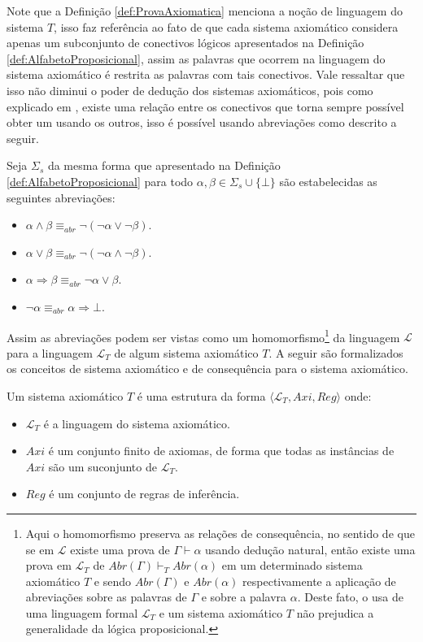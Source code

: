 Note que a Definição \ref{def:ProvaAxiomatica} menciona a noção de linguagem do sistema $T$, isso faz referência ao fato de que cada sistema axiomático considera apenas um subconjunto de conectivos lógicos apresentados na Definição \ref{def:AlfabetoProposicional}, assim as palavras que ocorrem na linguagem do sistema axiomático é restrita as palavras com tais conectivos. Vale ressaltar que isso não diminui o poder de dedução dos sistemas axiomáticos, pois como explicado em \cite{benja-Logica}, existe uma relação entre os conectivos que torna sempre possível obter um usando os outros, isso é possível usando abreviações como descrito a seguir. 

\begin{definicao}\label{def:Abreviacoes}
  Seja $\Sigma_s$ da mesma forma que apresentado na Definição \ref{def:AlfabetoProposicional} para todo $\alpha, \beta \in \Sigma_s \cup \{\bot\}$ são estabelecidas as seguintes abreviações:
  \begin{itemize}
      \item $\alpha \land \beta \equiv_{abr} \neg (\neg \alpha \lor \neg \beta)$.
      \item $\alpha \lor \beta \equiv_{abr} \neg (\neg \alpha \land \neg \beta)$.
      \item $\alpha \Rightarrow \beta \equiv_{abr} \neg \alpha \lor \beta$.
      \item $\neg \alpha \equiv_{abr} \alpha \Rightarrow \bot$.
  \end{itemize}
\end{definicao}

Assim as abreviações podem ser vistas como um homomorfismo\footnote{Aqui o homomorfismo preserva as relações de consequência, no sentido de que se em $\mathcal{L}$ existe uma prova de $\Gamma \vdash \alpha$ usando dedução natural, então existe uma prova em $\mathcal{L}_T$ de $Abr(\Gamma) \vdash_T Abr(\alpha)$ em um determinado sistema axiomático $T$ e sendo $Abr(\Gamma)$ e $Abr(\alpha)$ respectivamente a aplicação de abreviações sobre as palavras de $\Gamma$ e sobre a palavra $\alpha$. Deste fato, o usa de uma linguagem formal $\mathcal{L}_T$ e um sistema axiomático $T$ não prejudica a generalidade da lógica proposicional.} da linguagem $\mathcal{L}$ para a linguagem $\mathcal{L}_T$ de algum sistema axiomático $T$. A seguir são formalizados os conceitos de sistema axiomático e de consequência para o sistema axiomático.

\begin{definicao}\label{def:SistemaAxiomatico}
  Um sistema axiomático $T$ é uma estrutura da forma $\langle \mathcal{L}_T, Axi, Reg \rangle$ onde:
  \begin{itemize}
      \item $\mathcal{L}_T$ é a linguagem do sistema axiomático.
      \item $Axi$ é um conjunto finito de axiomas, de forma que todas as instâncias de $Axi$ são um suconjunto de $\mathcal{L}_T$.
      \item $Reg$ é um conjunto de regras de inferência.
  \end{itemize}
\end{definicao}

